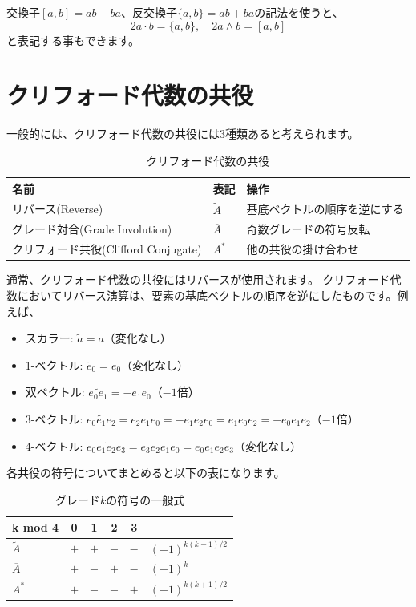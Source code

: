 \documentclass[a4paper,12pt,notitlepage]{jsreport}
\begin{document}
交換子$[a,b]=ab-ba$、反交換子$\{a,b\}=ab+ba$の記法を使うと、
\begin{equation}
  2a\cdot b=\{a,b\},\quad 2a\wedge b=[a,b]
\end{equation}
と表記する事もできます。

\section{クリフォード代数の共役}

一般的には、クリフォード代数の共役には3種類あると考えられます。
\begin{table}[ht]
  \centering
  \caption{クリフォード代数の共役}
  \begin{tabular}{|l|l|l|} \hline
    名前 & 表記 & 操作 \\ \hline
    リバース(Reverse) & $\widetilde{A}$ & 基底ベクトルの順序を逆にする \\ \hline
    グレード対合(Grade Involution) & $\overline{A}$ & 奇数グレードの符号反転 \\ \hline
    クリフォード共役(Clifford Conjugate) & $A^*$ & 他の共役の掛け合わせ \\ \hline
  \end{tabular}
\end{table}

通常、クリフォード代数の共役にはリバースが使用されます。
クリフォード代数においてリバース演算は、要素の基底ベクトルの順序を逆にしたものです。例えば、
\begin{itemize}
  \item スカラー: $\widetilde{a}=a$（変化なし）
  \item 1-ベクトル: $\widetilde{e_0}=e_0$（変化なし）
  \item 双ベクトル: $\widetilde{e_0e_1}=-e_1e_0$（$-1$倍）
  \item 3-ベクトル: $\widetilde{e_0e_1e_2}=e_2e_1e_0=-e_1e_2e_0=e_1e_0e_2=-e_0e_1e_2$（$-1$倍）
  \item 4-ベクトル: $\widetilde{e_0e_1e_2e_3}=e_3e_2e_1e_0=e_0e_1e_2e_3$（変化なし）
\end{itemize}

各共役の符号についてまとめると以下の表になります。
\begin{table}[ht]
  \centering
  \caption{グレード$k$の符号の一般式}
  \begin{tabular}{|l|c|c|c|c|l|} \hline
    k mod 4 & 0 & 1 & 2 & 3 & \\ \hline
    $\widetilde{A}$ & $+$ & $+$ & $-$ & $-$ & $(-1)^{k(k-1)/2}$ \\ \hline
    $\overline{A}$ & $+$ & $-$ & $+$ & $-$ & $(-1)^k$ \\ \hline
    $A^*$ & $+$ & $-$ & $-$ & $+$ & $(-1)^{k(k+1)/2}$ \\ \hline
  \end{tabular}
\end{table}
\end{document}
